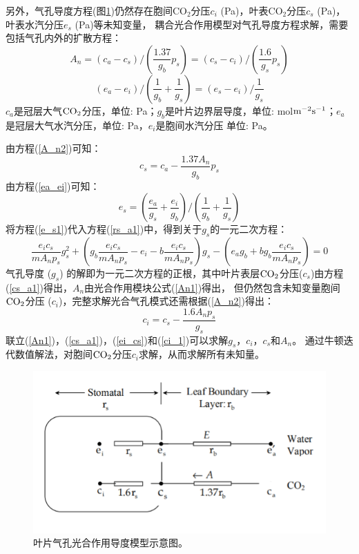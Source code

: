 另外，气孔导度方程(图\ref{fig:叶片气孔光合作用导度模型示意图})仍然存在胞间CO$_2$分压$c_i$ (Pa)，叶表CO$_2$分压$c_s$ (Pa)，叶表水汽分压$e_s$ (Pa)等未知变量，
耦合光合作用模型对气孔导度方程求解，需要包括气孔内外的扩散方程：
\begin{equation}\label{A_n2}
A_{n}=\left(c_{a}-c_{s}\right) /\left(\frac{1.37}{g_{b}} p_{s}\right)=\left(c_{s}-c_{i}\right) /\left(\frac{1.6}{g_{s}} p_{s}\right)
\end{equation}
\begin{equation}\label{ea_ei}
\left(e_{a}-e_{i}\right) /\left(\frac{1}{g_{b}}+\frac{1}{g_{s}}\right)=\left(e_{s}-e_{i}\right) / \frac{1}{g_{s}}
\end{equation}
$c_a$是冠层大气$\rm CO_2$分压，单位: Pa；$g_b$是叶片边界层导度，单位: mol$\rm m^{-2}s^{-1}$；$e_a$是冠层大气水汽分压，单位: Pa，$e_i$是胞间水汽分压 单位: Pa。

由方程(\ref{A_n2})可知：
\begin{equation}\label{cs_a1}
c_{s}=c_{a}-\frac{1.37 A_{n}}{g_{b}} p_{s}
\end{equation}
由方程(\ref{ea_ei})可知：
\begin{equation}\label{e_s1}
e_{s}=\left(\frac{e_{a}}{g_{s}}+\frac{e_{i}}{g_{b}}\right) /\left(\frac{1}{g_{b}}+\frac{1}{g_{s}}\right)
\end{equation}
将方程(\ref{e_s1})代入方程(\ref{rs_a1})中，得到关于$g_s$的一元二次方程：
\begin{equation}\label{ei_cs}
\frac{e_{i} c_{s}}{m A_{n} p_{s}} g_{s}^{2}+\left(g_{b} \frac{e_{i} c_{s}}{m A_{n} p_{s}}-e_{i}-b \frac{e_{i} c_{s}}{m A_{n} p_{s}}\right) g_{s}
-\left(e_{a} g_{b}+b g_{b} \frac{e_{i} c_{s}}{m A_{n} p_{s}}\right)=0
\end{equation}
气孔导度 ($g_s$) 的解即为一元二次方程的正根，其中叶片表层$\rm CO_2$分压($c_s$)由方程(\ref{cs_a1})得出，$A_n$由光合作用模块公式(\ref{An1})得出，
但仍然包含未知变量胞间$\rm CO_2$分压 ($c_i$)，完整求解光合气孔模式还需根据(\ref{A_n2})得出：
\begin{equation}\label{ci_1}
c_{i}=c_{s}-\frac{1.6 A_{n} p_{s}}{g_{s}}
\end{equation}
联立(\ref{An1})，(\ref{cs_a1})，(\ref{ei_cs})和(\ref{ci_1})可以求解$g_s$，$c_i$，$c_s$和$A_n$。
通过牛顿迭代数值解法，对胞间$\rm CO_2$分压$c_i$求解，从而求解所有未知量。

{
\begin{figure}[]
\centering
\includegraphics{Figures/气孔导度和光合作用/叶片气孔光合作用导度模型示意图.png}
\caption{叶片气孔光合作用导度模型示意图。}
\label{fig:叶片气孔光合作用导度模型示意图}
\end{figure}
}
